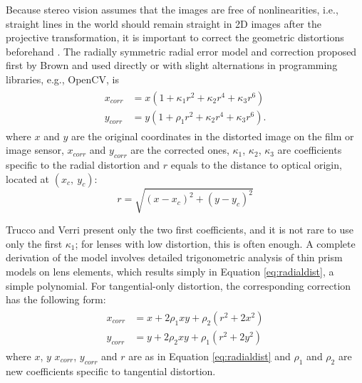 
Because stereo vision assumes that the images are free of nonlinearities, i.e., straight lines in the world should remain straight in 2D images after the projective transformation, it is important to correct the geometric distortions beforehand \cite{szeliski10vision}.
The radially symmetric radial error model and correction proposed first by Brown \cite{brown1971close,brown1966decentering} and used directly or with slight alternations in programming libraries, e.g., OpenCV, \cite{opencv} is %
\begin{align} \label{eq:radialdist} \begin{split}
	x_{corr} &= x(1 + \kappa_1 r^2 + \kappa_2 r^4 + \kappa_3 r^6)\\
	y_{corr} &= y(1 + \rho_1 r^2 + \kappa_2 r^4 + \kappa_3 r^6).
\end{split} \end{align}
where $x$ and $y$ are the original coordinates in the distorted image on the film or image sensor, $x_{corr}$ and $y_{corr}$ are the corrected ones, $\kappa_1$, $\kappa_2$, $\kappa_3$ are coefficients specific to the radial distortion and $r$ equals to the distance to optical origin, located at $(x_c,~y_c)$:
\begin{equation}
r = \sqrt{(x - x_c)^2 + (y - y_c)^2}
\end{equation}

Trucco and Verri \cite{trucco1998introductory} present only the two first coefficients, and it is not rare to use only the first $\kappa_1$; for lenses with low distortion, this is often enough.
A complete derivation of the model involves detailed trigonometric analysis of thin prism models on lens elements, which results simply in Equation \ref{eq:radialdist}, a simple polynomial.
For tangential-only distortion, the corresponding correction has the following form:
\begin{align} \label{eq:tangdist} \begin{split}
x_{corr} &= x + 2 \rho_1 x y + \rho_2 (r^2 + 2 x^2)\\
y_{corr} &= y + 2 \rho_2 x y + \rho_1 (r^2 + 2 y^2)
\end{split} \end{align}
where $x$, $y$ $x_{corr}$, $y_{corr}$ and $r$ are as in Equation \ref{eq:radialdist} and $\rho_1$ and $\rho_2$ are new coefficients specific to tangential distortion.

